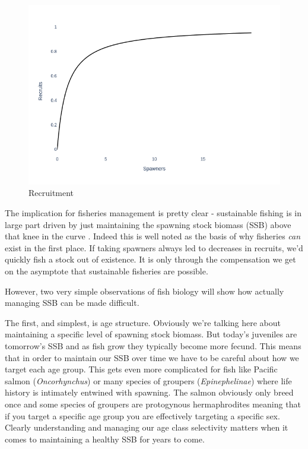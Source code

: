 \documentclass[11pt]{article}
\begin{document}
\begin{figure}[h!] 
  \includegraphics[width=\linewidth]{recruitment.png}
  \caption{Recruitment}
  \label{fig:recruitment}
\end{figure}



The implication for fisheries management is pretty clear - sustainable fishing is in large part driven by just maintaining the spawning stock biomass (SSB) above that knee in the curve \cite{waltersmartell} \cite{king}. Indeed this is well noted as the basis of why fisheries \textit{can} exist in the first place. If taking spawners always led to decreases in recruits, we'd quickly fish a stock out of existence. It is only through the compensation we get on the asymptote that sustainable fisheries are possible. \newline

However, two very simple observations of fish biology will show how actually managing SSB can be made difficult.

The first, and simplest, is age structure. Obviously we're talking here about maintaining a specific level of spawning stock biomass. But today's juveniles are tomorrow's SSB and as fish grow they typically become more fecund. This means that in order to maintain our SSB over time we have to be careful about how we target each age group. This gets even more complicated for fish like Pacific salmon (\textit{Oncorhynchus}) or many species of groupers (\textit{Epinephelinae}) where life history is intimately entwined with spawning. The salmon obviously only breed once \cite{NOAA24} and some species of groupers are protogynous hermaphrodites \cite{RedGrouper} meaning that if you target a specific age group you are effectively targeting a specific sex. Clearly understanding and managing our age class selectivity matters when it comes to maintaining a healthy SSB for years to come. \newline
\end{document}

